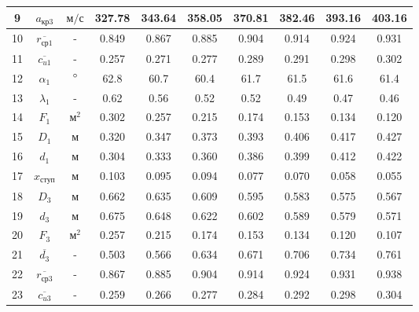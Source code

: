 \begin{landscape}
\begin{center}
\begin{longtable}{|c|c|c|c|c|c|c|c|c|c|}
				9 & $a_{кр3}$ & $м/с$ & 327.78 & 343.64 & 358.05 & 370.81 & 382.46 & 393.16 & 403.16 \\\hline
			
				10 & $\overline{r_{ср1}}$ & - & 0.849 & 0.867 & 0.885 & 0.904 & 0.914 & 0.924 & 0.931 \\\hline
			
				11 & $\overline{c_{u1}}$ & - & 0.257 & 0.271 & 0.277 & 0.289 & 0.291 & 0.298 & 0.302 \\\hline
			
				12 & $\alpha_1$ & $\degree$ & 62.8 & 60.7 & 60.4 & 61.7 & 61.5 & 61.6 & 61.4 \\\hline
			
				13 & $\lambda_1$ & - & 0.62 & 0.56 & 0.52 & 0.52 & 0.49 & 0.47 & 0.46 \\\hline
			
				14 & $F_1$ & $м^2$ & 0.302 & 0.257 & 0.215 & 0.174 & 0.153 & 0.134 & 0.120 \\\hline
			
				15 & $D_1$ & м & 0.320 & 0.347 & 0.373 & 0.393 & 0.406 & 0.417 & 0.427 \\\hline
			
				16 & $d_1$ & м & 0.304 & 0.333 & 0.360 & 0.386 & 0.399 & 0.412 & 0.422 \\\hline
			
				17 & $x_{ступ}$ & м & 0.103 & 0.095 & 0.094 & 0.077 & 0.070 & 0.058 & 0.055 \\\hline
			
				18 & $D_3$ & м & 0.662 & 0.635 & 0.609 & 0.595 & 0.583 & 0.575 & 0.567 \\\hline
			
				19 & $d_3$ & м & 0.675 & 0.648 & 0.622 & 0.602 & 0.589 & 0.579 & 0.571 \\\hline
			
				20 & $F_3$ & $м^2$ & 0.257 & 0.215 & 0.174 & 0.153 & 0.134 & 0.120 & 0.107 \\\hline
			
				21 & $\overline{d_3}$ & - & 0.503 & 0.566 & 0.634 & 0.671 & 0.706 & 0.734 & 0.761 \\\hline
			
				22 & $\overline{r_{ср3}}$ & - & 0.867 & 0.885 & 0.904 & 0.914 & 0.924 & 0.931 & 0.938 \\\hline
			
				23 & $\overline{c_{u3}}$ & - & 0.259 & 0.266 & 0.277 & 0.284 & 0.292 & 0.298 & 0.304 \\\hline
			

\end{longtable}
\end{center}
\end{landscape}
